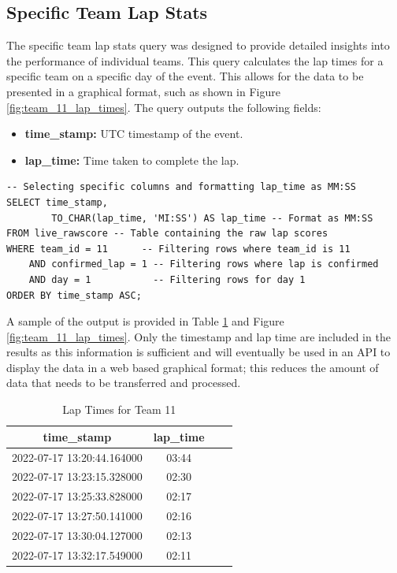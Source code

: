 \documentclass[11pt]{article}
\begin{document}
\pagebreak
\subsection{Specific Team Lap Stats}

The specific team lap stats query was designed to provide detailed insights into the performance of individual teams. This query calculates the lap times for a specific team on a specific day of the event. This allows for the data to be presented in a graphical format, such as shown in Figure \ref{fig:team_11_lap_times}. The query outputs the following fields:

\begin{itemize}
    \item \textbf{time\_stamp:} UTC timestamp of the event.
    \item \textbf{lap\_time:} Time taken to complete the lap.
\end{itemize}


\begin{lstlisting}[style=sql, caption={Live Score Query for day 3}, label={lst:sql_specific_team_lap_stats}]
-- Selecting specific columns and formatting lap_time as MM:SS
SELECT time_stamp,
        TO_CHAR(lap_time, 'MI:SS') AS lap_time -- Format as MM:SS
FROM live_rawscore -- Table containing the raw lap scores
WHERE team_id = 11      -- Filtering rows where team_id is 11
    AND confirmed_lap = 1 -- Filtering rows where lap is confirmed
    AND day = 1           -- Filtering rows for day 1
ORDER BY time_stamp ASC;
\end{lstlisting}


A sample of the output is provided in Table \ref{tab:lap_times} and Figure \ref{fig:team_11_lap_times}. Only the timestamp and lap time are included in the results as this information is sufficient and will eventually be used in an API to display the data in a web based graphical format; this reduces the amount of data that needs to be transferred and processed.

\begin{table}[H]
    \centering
    \begin{tabular}{|c|c|c|c|}
        \hline
        \textbf{time\_stamp}       & \textbf{lap\_time} \\
        \hline
        2022-07-17 13:20:44.164000 & 03:44              \\
        2022-07-17 13:23:15.328000 & 02:30              \\
        2022-07-17 13:25:33.828000 & 02:17              \\
        2022-07-17 13:27:50.141000 & 02:16              \\
        2022-07-17 13:30:04.127000 & 02:13              \\
        2022-07-17 13:32:17.549000 & 02:11              \\
        \hline
    \end{tabular}
    \caption{Lap Times for Team 11}
    \label{tab:lap_times}
\end{table}
\end{document}

